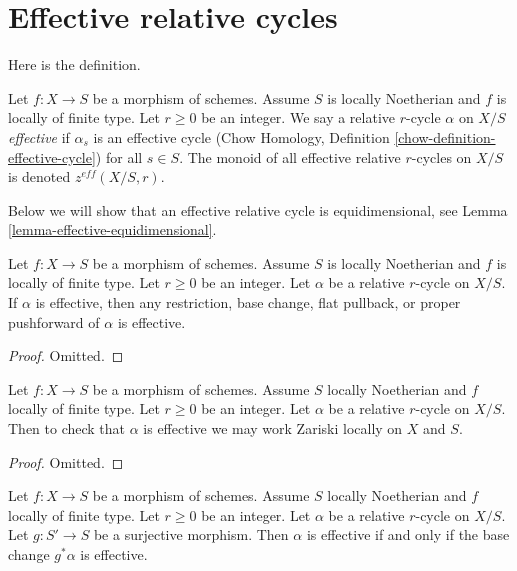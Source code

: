 \section{Effective relative cycles}
\label{section-effective}


\noindent
Here is the definition.

\begin{definition}
\label{definition-effective}
Let $f : X \to S$ be a morphism of schemes. Assume $S$ is locally Noetherian
and $f$ is locally of finite type. Let $r \geq 0$ be an integer. We say a
relative $r$-cycle $\alpha$ on $X/S$ {\it effective} if $\alpha_s$ is an
effective cycle
(Chow Homology, Definition \ref{chow-definition-effective-cycle})
for all $s \in S$. The monoid of all effective relative $r$-cycles
on $X/S$ is denoted $z^{eff}(X/S, r)$.
\end{definition}

\noindent
Below we will show that an effective relative cycle is equidimensional,
see Lemma \ref{lemma-effective-equidimensional}.

\begin{lemma}
\label{lemma-effective-functoriality}
Let $f : X \to S$ be a morphism of schemes. Assume $S$ is locally Noetherian
and $f$ is locally of finite type. Let $r \geq 0$ be an integer. Let
$\alpha$ be a relative $r$-cycle on $X/S$. If $\alpha$ is effective,
then any restriction, base change, flat pullback, or proper pushforward
of $\alpha$ is effective.
\end{lemma}

\begin{proof}
Omitted.
\end{proof}

\begin{lemma}
\label{lemma-check-effective}
Let $f : X \to S$ be a morphism of schemes. Assume $S$ locally Noetherian
and $f$ locally of finite type. Let $r \geq 0$ be an integer. Let $\alpha$
be a relative $r$-cycle on $X/S$. Then to check that $\alpha$ is effective
we may work Zariski locally on $X$ and $S$.
\end{lemma}

\begin{proof}
Omitted.
\end{proof}

\begin{lemma}
\label{lemma-effective-descent}
Let $f : X \to S$ be a morphism of schemes. Assume $S$ locally Noetherian
and $f$ locally of finite type. Let $r \geq 0$ be an integer. Let $\alpha$
be a relative $r$-cycle on $X/S$. Let $g : S' \to S$ be a surjective morphism.
Then $\alpha$ is effective if and only if the base change $g^*\alpha$
is effective.
\end{lemma}


